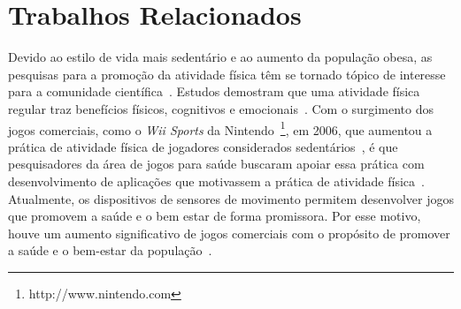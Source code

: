 %
%
%
%


\section{Trabalhos Relacionados}\label{section:trabalhos_relacionados}
Devido ao estilo de vida mais sedentário e ao aumento da população obesa, as pesquisas para a promoção da atividade física têm se tornado tópico de interesse para a comunidade científica~\cite{maitland2009,bartolome11,Mandryk2014}. Estudos demostram que uma atividade física regular traz benefícios físicos, cognitivos e emocionais~\cite{Mandryk2014}. Com o surgimento dos jogos comerciais, como o \textit{Wii Sports} da Nintendo~\footnote{http://www.nintendo.com}, em 2006, que aumentou a prática de atividade física de jogadores considerados sedentários~\cite{wiigraves2008}, é que pesquisadores da área de jogos para saúde buscaram apoiar essa prática com desenvolvimento de aplicações que motivassem a prática de atividade física~\cite{stacey2011}. Atualmente, os dispositivos de sensores de movimento permitem desenvolver jogos que promovem a saúde e o bem estar de forma promissora. Por esse motivo, houve um aumento significativo de jogos comerciais com o propósito de promover a saúde e o bem-estar da população~\cite{Papastergiou:2009:EPC:1570538.1570707}.


